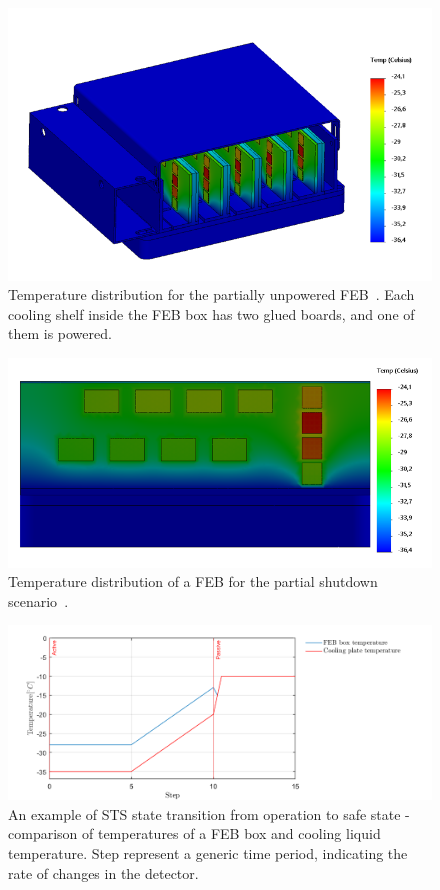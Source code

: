 \begin{figure}[!h]
\centering
\includegraphics[width=0.57\columnwidth]{Chapter4/images/reboot_box.png}
\caption{Temperature distribution for the partially unpowered \gls{FEB}~\cite{Agarwal}. Each cooling shelf inside the \gls{FEB} box has two glued boards, and one of them is powered.}
\label{fig_reboot_box}
\end{figure}

\begin{figure}[!h]
\centering
\includegraphics[width=0.6\columnwidth]{Chapter4/images/reboot_FEB.png}
\caption{Temperature distribution of a \gls{FEB} for the partial shutdown scenario~\cite{Agarwal}.}
\label{fig_reboot_FEB}
\end{figure}

\begin{figure}[!h]
\centering
\includegraphics[width=0.85\columnwidth]{Chapter4/images/nominal.png}
\caption{An example of \gls{STS} state transition from operation to safe state - comparison of temperatures of a \gls{FEB} box and cooling liquid temperature. Step represent a generic time period, indicating the rate of changes in the detector.}
\label{fig_reboot_nominal2}
\end{figure}

